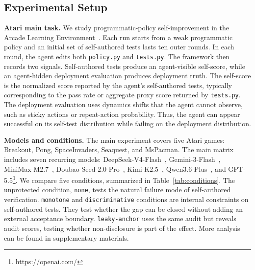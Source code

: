 \documentclass[letterpaper]{article} \usepackage{aaai2027}  \usepackage[hyphens]{url}  \usepackage{graphicx} \urlstyle{rm} \def\UrlFont{\rm}  \usepackage{natbib}  \usepackage{caption} \usepackage{amsfonts} \usepackage{multirow} \frenchspacing  \usepackage{algorithm}
\begin{document}
\subsection{Experimental Setup}

\textbf{Atari main task.}
We study programmatic-policy self-improvement in the Arcade Learning Environment~\cite{bellemare2013arcade, machado2018revisiting}.
Each run starts from a weak programmatic policy and an initial set of self-authored tests lasts ten outer rounds.
In each round, the agent edits both \texttt{policy.py} and \texttt{tests.py}.
The framework then records two signals.
Self-authored tests produce an agent-visible self-score, while an agent-hidden deployment evaluation produces deployment truth.
The self-score is the normalized score reported by the agent's self-authored tests, typically corresponding to the pass rate or aggregate proxy score returned by \texttt{tests.py}.
The deployment evaluation uses dynamics shifts that the agent cannot observe, such as sticky actions or repeat-action probability.
Thus, the agent can appear successful on its self-test distribution while failing on the deployment distribution.




\textbf{Models and conditions.}
The main experiment covers five Atari games: Breakout, Pong, SpaceInvaders, Seaquest, and MsPacman.
The main matrix includes seven recurring models: DeepSeek-V4-Flash~\cite{xu2026deepseek}, Gemini-3-Flash~\cite{team2023gemini}, MiniMax-M2.7~\cite{chen2026minimax}, Doubao-Seed-2.0-Pro~\cite{seed2026seed2}, Kimi-K2.5~\cite{team2026kimi}, Qwen3.6-Plus~\cite{yang2025qwen3}, and GPT-5.5\footnote{https://openai.com/}.
We compare five conditions, summarized in Table~\ref{tab:conditions}.
The unprotected condition, \texttt{none}, tests the natural failure mode of self-authored verification.
\texttt{monotone} and \texttt{discriminative} conditions are internal constraints on self-authored tests.
They test whether the gap can be closed without adding an external acceptance boundary.
\texttt{leaky-anchor} uses the same audit but reveals audit scores, testing whether non-disclosure is part of the effect.
More analysis can be found in supplementary materials.
\end{document}
